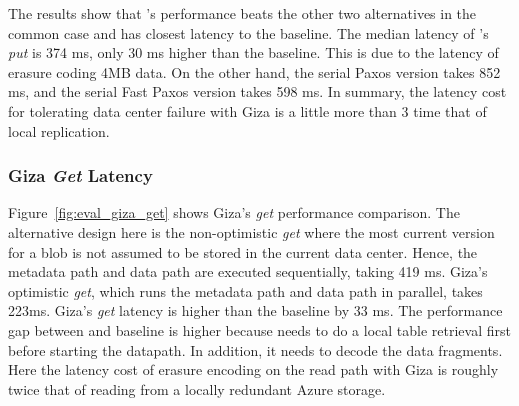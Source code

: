 The results show that \name's performance beats the other two alternatives in
the common case and has closest latency to the baseline. The median latency of
\name's {\em put} is 374 ms, only 30 ms higher than the baseline. This is due to
the latency of erasure coding 4MB data. On the other hand, the serial Paxos
version takes 852 ms, and the serial Fast Paxos version takes 598 ms. In
summary, the latency cost for tolerating data center failure with Giza is a
little more than 3 time that of local replication.

\subsubsection{Giza {\em Get} Latency}

Figure~\ref{fig:eval_giza_get} shows Giza's {\em get} performance comparison.
The alternative design here is the non-optimistic {\em get } where the most
current version for a blob is not assumed to be stored in the current data
center. Hence, the metadata path and data path are executed sequentially, taking
419 ms. Giza's optimistic {\em get}, which runs the metadata path and data path
in parallel, takes 223ms. Giza's {\em get} latency is higher than the baseline
by 33 ms. The performance gap between \name and baseline is higher because \name
needs to do a local table retrieval first before starting the datapath. In
addition, it needs to decode the data fragments. Here the latency cost of
erasure encoding on the read path with Giza is roughly twice that of reading
from a locally redundant Azure storage.





